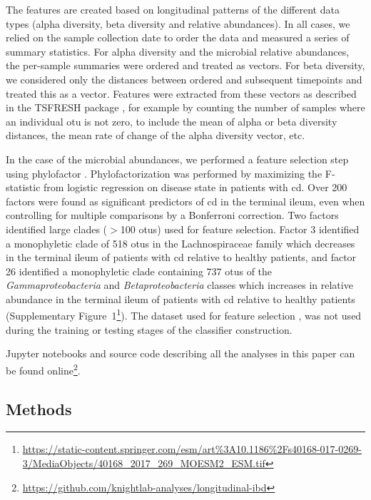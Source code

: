 The features are created based on longitudinal patterns of the different data types (alpha diversity, beta diversity and relative abundances). In all cases, we relied on the sample collection date to order the data and measured a series of summary statistics. For alpha diversity and the microbial relative abundances, the per-sample summaries were ordered and treated as vectors. For beta diversity, we considered only the distances between ordered and subsequent timepoints and treated this as a vector. Features were extracted from these vectors as described in the TSFRESH package \cite{RN4216}, for example by counting the number of samples where an individual \gls{otu} is not zero, to include the mean of alpha or beta diversity distances, the mean rate of change of the alpha diversity vector, etc.

In the case of the microbial abundances, we performed a feature selection step using phylofactor \cite{RN4204}. Phylofactorization was performed by maximizing the F-statistic from logistic regression on disease state in patients with \gls{cd}. Over 200 factors were found as significant predictors of \gls{cd} in the terminal ileum, even when controlling for multiple comparisons by a Bonferroni correction. Two factors identified large clades ($>$100 \glspl{otu}) used for feature selection. Factor 3 identified a monophyletic clade of 518 \glspl{otu} in the Lachnospiraceae family which decreases in the terminal ileum of patients with \gls{cd} relative to healthy patients, and factor 26 identified a monophyletic clade containing 737 \glspl{otu} of the \textit{Gammaproteobacteria} and \textit{Betaproteobacteria} classes which increases in relative abundance in the terminal ileum of patients with \gls{cd} relative to healthy patients (Supplementary Figure~1\footnote{\url{https://static-content.springer.com/esm/art\%3A10.1186\%2Fs40168-017-0269-3/MediaObjects/40168_2017_269_MOESM2_ESM.tif}}). The dataset used for feature selection \cite{RN140}, was not used during the training or testing stages of the classifier construction.

Jupyter notebooks and source code describing all the analyses in this paper can be found online\footnote{\url{https://github.com/knightlab-analyses/longitudinal-ibd}}.

\subsection{Methods}

